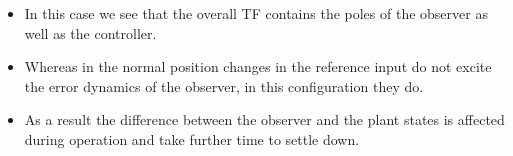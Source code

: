 \begin{itemize}
	\item In this case we see that the overall TF contains the poles of the observer as well as the controller.
	\item Whereas in the normal position changes in the reference input do not excite the error dynamics of the observer, in this configuration they do.
	\item As a result the difference between the observer and the plant states is affected during operation and take further time to settle down.
\end{itemize}

\endinput

